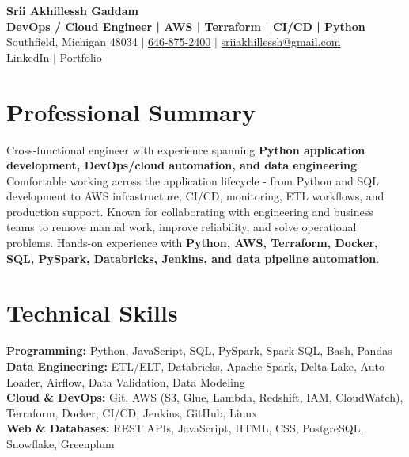 \documentclass[letterpaper,10pt]{article}
\begin{document}
\fontsize{9.35pt}{10.45pt}\selectfont

\begin{center}
    {\LARGE \textbf{Srii Akhillessh Gaddam}} \\[-1pt]
    \textbf{DevOps / Cloud Engineer | AWS | Terraform | CI/CD | Python} \\[2pt]
    Southfield, Michigan 48034 $|$
    \href{tel:6468752400}{646-875-2400} $|$
    \href{mailto:sriiakhillessh@gmail.com}{sriiakhillessh@gmail.com} \\[1pt]
    \href{https://www.linkedin.com/in/srii-akhiilessh-gaddam-b48668191/}{LinkedIn} $|$
    \href{https://sriiakhillesshg.github.io/portfolio/}{Portfolio}
\end{center}
\vspace{-8pt}

\section{Professional Summary}
\small{Cross-functional engineer with experience spanning \textbf{Python application development, DevOps/cloud automation, and data engineering}. Comfortable working across the application lifecycle - from Python and SQL development to AWS infrastructure, CI/CD, monitoring, ETL workflows, and production support. Known for collaborating with engineering and business teams to remove manual work, improve reliability, and solve operational problems. Hands-on experience with \textbf{Python, AWS, Terraform, Docker, SQL, PySpark, Databricks, Jenkins, and data pipeline automation}.}

\section{Technical Skills}
\small{
\textbf{Programming:} Python, JavaScript, SQL, PySpark, Spark SQL, Bash, Pandas \\
\textbf{Data Engineering:} ETL/ELT, Databricks, Apache Spark, Delta Lake, Auto Loader, Airflow, Data Validation, Data Modeling \\
\textbf{Cloud \& DevOps:} Git, AWS (S3, Glue, Lambda, Redshift, IAM, CloudWatch), Terraform, Docker, CI/CD, Jenkins, GitHub, Linux \\
\textbf{Web \& Databases:} REST APIs, JavaScript, HTML, CSS, PostgreSQL, Snowflake, Greenplum
}
\end{document}
